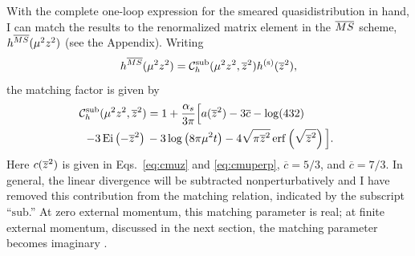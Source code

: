 With the complete one-loop expression for the smeared quasidistribution in hand, I can match the results to the renormalized matrix element in the $\overline{MS}$ scheme, $h^{\overline{MS}}(\mu^2z^2)$ (see the Appendix). Writing
\begin{equation}
h^{\overline{MS}}(\mu^2z^2) = {\cal C}_h^{\mathrm{sub}}(\mu^2z^2,\overline{z}^2)h^{(\mathrm{s})}(\overline{z}^2),
\end{equation}
the matching factor is given by
\begin{align}
\!\!{\cal C}_h^{\mathrm{sub}}(\mu^2z^2,\overline{z}^2){} &  = 1 +\frac{\alpha_s}{3\pi}\Big[a(\overline{z}^2)-3\overline{c} -\log(432)\nonumber\\
 - 3\operatorname{Ei}\left(-\overline{z}^2\right) {} & -3\log\left(8\pi\mu^2t\right) -4\sqrt{\pi\overline{z}^2}\operatorname{erf}\left(\sqrt{\overline{z}^2}\right)\Big].
\end{align}
Here $c(\overline{z}^2)$ is given in Eqs.~\eqref{eq:cmuz} and \eqref{eq:cmuperp}, $\overline{c} =5/3$, and $\overline{c} =7/3$. In general, the linear divergence will be subtracted nonperturbatively and I have removed this contribution from the matching relation, indicated by the subscript ``$\mathrm{sub}$.''
At zero external momentum, this matching parameter is real; at finite external momentum, discussed in the next section, the matching parameter becomes imaginary  \cite{Constantinou:2017sej}.
